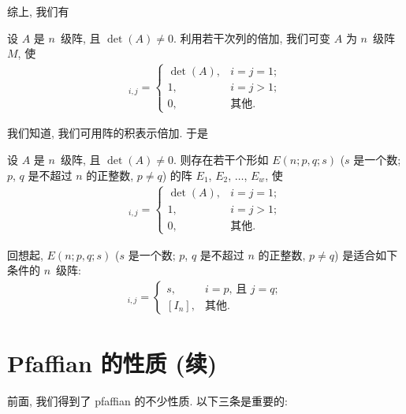 综上, 我们有

\begin{theorem}
    设 \(A\) 是 \(n\)~级阵,
    且 \(\det {(A)} \neq 0\).
    利用若干次列的倍加,
    我们可变 \(A\) 为 \(n\)~级阵 \(M\),
    使
    \begin{align*}
        [M]_{i,j} =
        \begin{cases}
            \det {(A)}, & i = j = 1; \\
            1,          & i = j > 1; \\
            0,          & \text{其他}.
        \end{cases}
    \end{align*}
\end{theorem}

我们知道, 我们可用阵的积表示倍加.
于是

\begin{theorem}
    设 \(A\) 是 \(n\)~级阵,
    且 \(\det {(A)} \neq 0\).
    则存在若干个形如 \(E(n; p, q; s)\)
    (\(s\) 是一个数;
    \(p\), \(q\) 是不超过 \(n\) 的正整数,
    \(p \neq q\))
    的阵
    \(E_1\), \(E_2\), \(\dots\), \(E_w\),
    使
    \begin{align*}
        [A E_1 E_2 \dots E_w]_{i,j} =
        \begin{cases}
            \det {(A)}, & i = j = 1; \\
            1,          & i = j > 1; \\
            0,          & \text{其他}.
        \end{cases}
    \end{align*}
\end{theorem}

回想起, \(E(n; p, q; s)\)
(\(s\) 是一个数;
\(p\), \(q\) 是不超过 \(n\) 的正整数,
\(p \neq q\))
是适合如下条件的 \(n\)~级阵:
\begin{align*}
    [E(n; p, q; s)]_{i,j}
    = \begin{cases}
          s,     & \text{\(i = p\), 且 \(j = q\)}; \\
          [I_n], & \text{其他}.
      \end{cases}
\end{align*}

\section{Pfaffian 的性质 (续)}

前面, 我们得到了 pfaffian 的不少性质.
以下三条是重要的:

